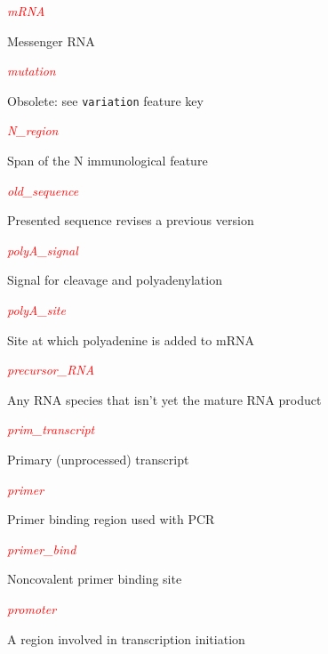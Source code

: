 \textcolor{red}{\textit{mRNA}}
\begin{adjustwidth}{2em}{}
Messenger RNA
\end{adjustwidth}

\textcolor{red}{\textit{mutation}}
\begin{adjustwidth}{2em}{}
Obsolete: see \verb|variation| feature key
\end{adjustwidth}

\textcolor{red}{\textit{N\_region}}
\begin{adjustwidth}{2em}{}
Span of the N immunological feature
\end{adjustwidth}

\textcolor{red}{\textit{old\_sequence}}
\begin{adjustwidth}{2em}{}
Presented sequence revises a previous version
\end{adjustwidth}

\textcolor{red}{\textit{polyA\_signal}}
\begin{adjustwidth}{2em}{}
Signal for cleavage and polyadenylation
\end{adjustwidth}

\textcolor{red}{\textit{polyA\_site}}
\begin{adjustwidth}{2em}{}
Site at which polyadenine is added to mRNA
\end{adjustwidth}

\textcolor{red}{\textit{precursor\_RNA}}
\begin{adjustwidth}{2em}{}
Any RNA species that isn't yet the mature RNA product
\end{adjustwidth}

\textcolor{red}{\textit{prim\_transcript}}
\begin{adjustwidth}{2em}{}
Primary (unprocessed) transcript
\end{adjustwidth}

\textcolor{red}{\textit{primer}}
\begin{adjustwidth}{2em}{}
Primer binding region used with PCR
\end{adjustwidth}

\textcolor{red}{\textit{primer\_bind}}
\begin{adjustwidth}{2em}{}
Noncovalent primer binding site
\end{adjustwidth}

\textcolor{red}{\textit{promoter}}
\begin{adjustwidth}{2em}{}
A region involved in transcription initiation
\end{adjustwidth}

